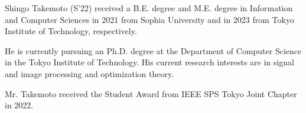 \documentclass[10pt,journal]{IEEEtran}
\begin{document}





 


\vspace{11pt}


\begin{IEEEbiography}{Shingo Takemoto}
    (S’22) received a B.E. degree and M.E. degree in Information and Computer Sciences in 2021 from Sophia University and in 2023 from Tokyo Institute of Technology, respectively. 
    
    He is currently pursuing an Ph.D. degree at the Department of Computer Science in the Tokyo Institute of Technology. 
    His current research interests are in signal and image processing and optimization theory.
    
    Mr. Takemoto received the Student Award from IEEE SPS Tokyo Joint Chapter in 2022.
\end{IEEEbiography}
\end{document}
